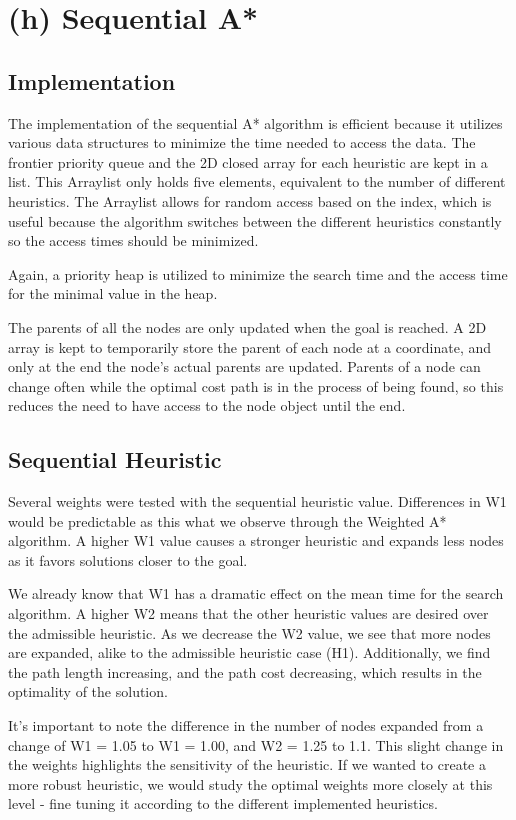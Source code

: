 \section{(h) Sequential A*}

\subsection{Implementation}

The implementation of the sequential A* algorithm is efficient because it utilizes various data structures to minimize the time needed to access the data. The frontier priority queue and the 2D closed array for each heuristic are kept in a list. This Arraylist only holds five elements, equivalent to the number of different heuristics. The Arraylist allows for random access based on the index, which is useful because the algorithm switches between the different heuristics constantly so the access times should be minimized.

Again, a priority heap is utilized to minimize the search time and the access time for the minimal value in the heap.

The parents of all the nodes are only updated when the goal is reached. A 2D array is kept to temporarily store the parent of each node at a coordinate, and only at the end the node's actual parents are updated. Parents of a node can change often while the optimal cost path is in the process of being found, so this reduces the need to have access to the node object until the end.


\subsection{Sequential Heuristic}
Several weights were tested with the sequential heuristic value. Differences in W1 would be predictable as this what we observe through the Weighted A* algorithm. A higher W1 value causes a stronger heuristic and expands less nodes as it favors solutions closer to the goal.

We already know that W1 has a dramatic effect on the mean time for the search algorithm. A higher W2 means that the other heuristic values are desired over the admissible heuristic. As we decrease the W2 value, we see that more nodes are expanded, alike to the admissible heuristic case (H1). Additionally, we find the path length increasing, and the path cost decreasing, which results in the optimality of the solution.

It's important to note the difference in the number of nodes expanded from a change of W1 = 1.05 to W1 = 1.00, and W2 = 1.25 to 1.1. This slight change in the weights highlights the sensitivity of the heuristic. If we wanted to create a more robust heuristic, we would study the optimal weights more closely at this level - fine tuning it according to the different implemented heuristics.

